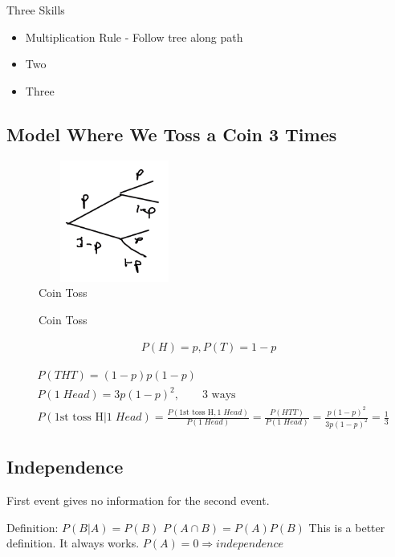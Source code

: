 Three Skills
\begin{itemize}
    \item Multiplication Rule - Follow tree along path
    \item Two
    \item Three
\end{itemize}

\subsection{Model Where We Toss a Coin 3 Times}

\begin{figure}[!ht]
\centering
\includegraphics[width=5cm, height=4cm]{images/L03/coin_toss3.jpeg}
\caption{Coin Toss}
\end{figure}

\begin{figure}[!ht]
\centering

\caption{Coin Toss}
\end{figure}


\begin{align*}
P(H)=p, P(T)=1-p
\end{align*}

\begin{align*}
&P(THT)=(1-p)p(1-p)\\
&P(1\;Head)=3p(1-p)^2, \qquad \text{3 ways}\\
&P(\text{1st toss H}|1\;Head)=\frac{P(\text{1st toss H},1\;Head)}{P(1\;Head)}=\frac{P(HTT)}{P(1\;Head)}=\frac{p(1-p)^2}{3p(1-p)^2}=\frac{1}{3}
\end{align*}
% 

\subsection{Independence}


First event gives no information for the second event.

Definition: $P(B|A)=P(B)$
$P(A \cap B)=P(A)P(B)$ This is a better definition.  It always works.
$P(A)=0 \Rightarrow independence$

